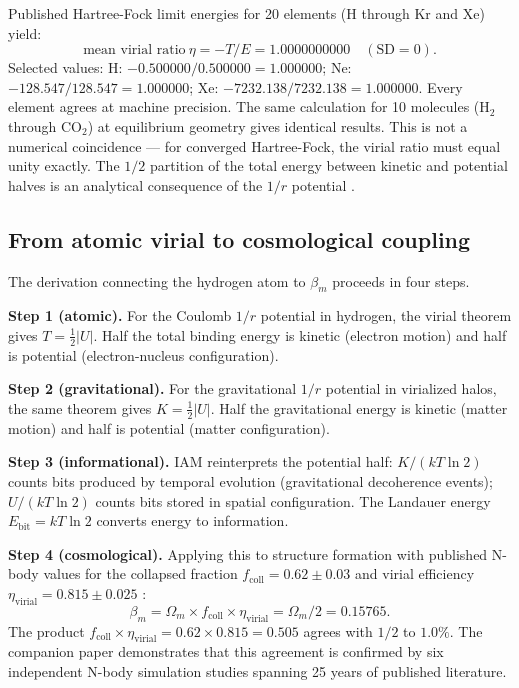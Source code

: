 \documentclass[12pt,a4paper]{article}
\begin{document}
Published Hartree-Fock limit energies for 20 elements (H through Kr and Xe)
\citep{Clementi1974,Bunge1993} yield:
\begin{equation}
  \text{mean virial ratio}\ \eta = -T/E = 1.0000000000\quad(\text{SD} = 0).
\end{equation}
Selected values: H: $-0.500000/0.500000 = 1.000000$; Ne: $-128.547/128.547 = 1.000000$;
Xe: $-7232.138/7232.138 = 1.000000$. Every element agrees at machine precision. The
same calculation for 10 molecules (H$_2$ through CO$_2$) at equilibrium geometry gives
identical results. This is not a numerical coincidence --- for converged Hartree-Fock,
the virial ratio must equal unity exactly. The $1/2$ partition of the
total energy between kinetic and potential halves is an analytical consequence of the
$1/r$ potential \citep[Eq.~\ref{eq:virial}]{Clausius1870}.

\subsection{From atomic virial to cosmological coupling}

The derivation connecting the hydrogen atom to $\beta_m$ proceeds in four steps.

\textbf{Step 1 (atomic).} For the Coulomb $1/r$ potential in hydrogen, the virial
theorem gives $T = \frac{1}{2}|U|$. Half the total binding energy is kinetic (electron
motion) and half is potential (electron-nucleus configuration).

\textbf{Step 2 (gravitational).} For the gravitational $1/r$ potential in virialized
halos, the same theorem gives $K = \frac{1}{2}|U|$. Half the gravitational energy is
kinetic (matter motion) and half is potential (matter configuration).

\textbf{Step 3 (informational).} IAM reinterprets the potential half: $K/(kT\ln2)$
counts bits produced by temporal evolution (gravitational decoherence events);
$U/(kT\ln2)$ counts bits stored in spatial configuration. The Landauer energy
$E_\mathrm{bit} = kT\ln2$ \citep{Landauer1961} converts energy to information.

\textbf{Step 4 (cosmological).} Applying this to structure formation with published
N-body values for the collapsed fraction $f_\mathrm{coll} = 0.62 \pm 0.03$
\citep{Tinker2008} and virial efficiency $\eta_\mathrm{virial} = 0.815 \pm 0.025$
\citep[see companion paper]{Mahaffey2026b}:
\begin{equation}
  \beta_m = \Omega_m \times f_\mathrm{coll} \times \eta_\mathrm{virial}
          = \Omega_m/2 = 0.15765.
  \label{eq:betam}
\end{equation}
The product $f_\mathrm{coll} \times \eta_\mathrm{virial} = 0.62 \times 0.815 = 0.505$
agrees with $1/2$ to $1.0\%$. The companion paper \citep{Mahaffey2026b} demonstrates
that this agreement is confirmed by six independent N-body simulation studies spanning
25 years of published literature.
\end{document}
